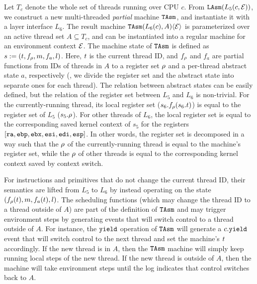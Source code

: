 {Let $T_c$ denote the whole set of threads running over CPU $c$.
From ${\texttt{LAsm}}(L_5(c,\mathcal{E}))$, we construct a new 
multi-threaded \emph{partial} machine ${\texttt{TAsm}}$,
and instantiate it with a layer interface $L_6$.
The result machine 
${\texttt{TAsm}}(L_6(c), A)\langle \mathcal{E} \rangle$ is 
parameterized over an active thread set $A \subseteq T_c$,
and can be instantiated into a regular machine for
an environment context $\mathcal{E}$.
The machine state of ${\texttt{TAsm}}$ is defined as $s:=(t, f_\rho, m, f_a, l)$.
Here, $t$ is the current thread ID, and
$f_\rho$ and $f_a$ are partial functions
from IDs of threads in $A$ to a register set $\rho$
and a per-thread abstract state $a$, respectively (\ie,
we divide the register set and the abstract state
into separate ones for each thread).
The relation between abstract states
can be easily defined, but the relation of the register set between $L_5$ and $L_6$ is non-trivial.
For the currently-running thread, its local register set ($s_6.f_\rho(s_6.t)$) is equal
to the register set of $L_5$ ($s_5.\rho$).
For other threads of $L_6$, the local register set is equal
to the corresponding saved kernel context of $s_5$ for the registers
$[{\texttt{ra}}, {\texttt{ebp}}, {\texttt{ebx}}, {\texttt{esi}}, {\texttt{edi}}, {\texttt{esp}}]$.
In other words, the register set is decomposed in a way such that the $\rho$ of the
currently-running thread is equal to the machine's register set, while the $\rho$ of
other threads is equal to the corresponding kernel context saved by context switch.


For instructions and primitives that do not change the current thread
ID, their semantics are lifted from $L_5$ to $L_6$
by instead operating on the state $(f_\rho(t), m, f_a(t), l)$.
The scheduling functions (which may change the thread ID to a thread outside of $A$)
are part of the definition of ${\texttt{TAsm}}$
and may trigger environment steps by generating events
that will switch control to a thread outside of $A$.
For instance,
the ${\texttt{yield}}$ operation of ${\texttt{TAsm}}$
will generate a $c.{\texttt{yield}}$ event that will switch control to the next thread
and set the machine's $t$ accordingly.
If the new thread is in $A$,
then the ${\texttt{TAsm}}$ machine will simply keep running local steps of the new thread.
If the new thread is outside of $A$,
then the machine will take environment steps
until the log indicates that control switches back to  $A$.

}
